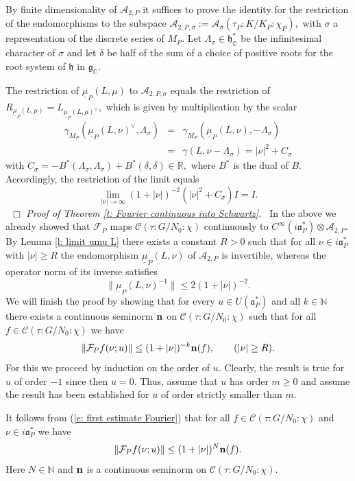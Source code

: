 \documentclass[12pt,a4paper]{article}
\def\proof{\par\noindent{\it Proof.}{\ }{\ }}
\def\qed{~\hfill\hbox{$\Box$}\medbreak}
\def\qquad{\quad\quad}
\def\msy#1{{\mathbb #1}}
\def\C{{\msy C}}
\def\N{{\msy N}}
\def\R{{\msy R}}
\def\gd{\delta}
\def\gg{\gamma}
\def\gs{\sigma}
\def\got#1{\mathfrak #1}
\def\fa{{\got a}}
\def\fg{{\got g}}
\def\fh{{\got h}}
\def\to{\rightarrow}
\def\iC{{\scriptscriptstyle \C}}
\def\cA{{\mathcal A}}
\def\cC{{\mathcal C}}
\def\cF{{\mathcal F}}
\numberwithin{Thm}{section}
\numberwithin{equation}{section}
\def\faPd{{\fa_P^*}}
\def\gL{\Lambda}
\def\fhdc{\fh_\iC^*}
\numberwithin{equation}{section}
\def\gL{\Lambda}
\def\fhdc{\fh_\iC^*}
\def\fh{{\mathfrak h}}
\def\cAtwoP{\cA_{2,P}}
\def\col{\!:\!}
\def\umu{\underline{\mu}}
\def\cchi{\chi}
\def\veec{\vee}%
\begin{document}
\proof 
By finite dimensionality of $\cAtwoP$ it suffices to prove the
identity for the restriction of the endomorphisms to the subspace 
$\cA_{2,P, \gs} :=\cA_\gs(\tau_P\!:\! K/K_P\col \cchi_P),$ 
with $\gs$ a representation of  the discrete series of $M_P.$ 
Let $\gL_\gs \in \fhdc$ 
% 
be the infinitesimal character of $\gs$ and let $\gd$ be half of the sum of a choice
of positive roots for the root system of $\fh$ in $\fg_\iC.$ 

The restriction of $\umu_P(L, \mu)$ to $\cA_{2, P, \gs}$ 
equals the restriction of $R_{\umu_P(L, \mu)} = L_{\umu_P(L, \mu)^\veec},$
which is given by multiplication by the scalar 
\begin{eqnarray*}
\gg_{M_P} (\umu_P(L, \nu)^\veec, \Lambda_\gs) & = & 
\gg_{M_P} (\umu_P(L, \nu), - \Lambda_\gs) \\
&= &\gg(L, \nu - \gL_\gs)=  |\nu|^2 + C_\gs
\end{eqnarray*} 
with $C_\gs = - B^*(\gL_\gs , \gL_\gs) + B^*(\gd, \gd) \in \R,$ where $B^*$ is the dual 
of $B.$ 
Accordingly, the restriction of the limit equals
$$ 
\lim_{|\nu| \to \infty} (1 + |\nu|)^{-2} ( |\nu|^2 +  C_\gs) I = I.
$$%
\qed
\medbreak
{\em Proof of Theorem \ref{t: Fourier continuous into Schwartz}.\ }
In the above we already showed that $\cF_P$ maps $\cC(\tau: G/N_0\col \cchi)$ 
continuously to $C^\infty(i\faPd) \otimes \cA_{2,P}.$ By Lemma \ref{l: limit umu L}
there exists
a constant $R > 0$ such that for all $\nu \in i\faPd$ with $|\nu| \geq R$ 
the endomorphism $\umu_P(L, \nu)$ of $\cAtwoP$ is invertible,
whereas the operator norm of its inverse satisfies 
$$ 
\| \umu_P(L, \nu)^{-1} \| \leq 2(1 + |\nu|)^{-2}. 
$$%
We will finish the proof by showing that for every $u \in U(\faPd)$ and all
$k \in \N$ there exists a continuous seminorm $\bf n$ on $\cC(\tau: G/N_0\col \cchi)$ 
such that for all $f \in \cC(\tau: G/N_0\col \cchi)$ we have 
$$
\|\cF_Pf(\nu; u)\| \leq (1 + |\nu|)^{-k}  {\bf n}(f), \qquad (|\nu| \geq R).
$$%
For this we proceed by induction on the order of $u.$ Clearly, the result is true
for $u$ of order $-1$ since then $u= 0.$ Thus, assume that $u$ 
has order $m \geq 0$ and assume the result has been established for
$u$ of order strictly smaller than $m.$ 

It follows from (\ref{e: first estimate Fourier})
that for all $f \in \cC(\tau: G/N_0\col \cchi)$ and $\nu \in i\faPd$ we have 
\begin{equation}
\label{e: initial estimate cFP f}
\|\cF_Pf(\nu;u )\| \leq (1 + |\nu|)^{N}  {\bf n}(f).
\end{equation} 
Here $N \in \N$ and ${\bf n}$ is a continuous seminorm on $\cC(\tau: G/N_0\col \cchi).$ 
\end{document}
